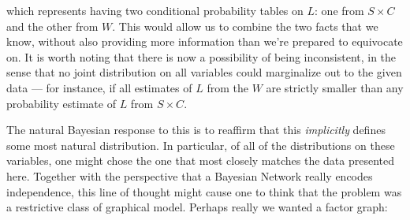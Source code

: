 \documentclass{article}
\begin{document}
\begin{example}
		which represents having two conditional probability tables on $L$: one from $S \times C$ and the other from $W$. This would allow us to combine the two facts that we know, without also providing more information than we're prepared to equivocate on. It is worth noting that there is now a possibility of being inconsistent, in the sense that no joint distribution on all variables could marginalize out to the given data --- for instance, if all estimates of $L$ from the $W$ are strictly smaller than any probability estimate of $L$ from $S \times C$.
		
		
		The natural Bayesian response to this is to reaffirm that this \textit{implicitly} defines some most natural distribution. In particular, of all of the distributions on these variables, one might chose the one that most closely matches the data presented here.
		Together with the perspective that a Bayesian Network really encodes independence, this line of thought might cause one to think that the problem was a restrictive class of graphical model. Perhaps really we wanted a factor graph:
		
		\begin{center}
\end{center}
\end{example}
\end{document}
